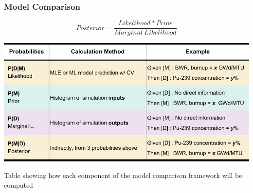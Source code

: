 \begin{frame}
  \frametitle{Model Comparison}
  $$ Posterior = \frac{Likelihood * Prior}{Marginal \ Likelihood} $$
  \begin{table}[h!]
    \centering
    \includegraphics[width=0.8\linewidth]{./figures/bayes.png}
    \caption{Table showing how each component of the model comparison framework will be computed}
  \end{table}
\end{frame}

